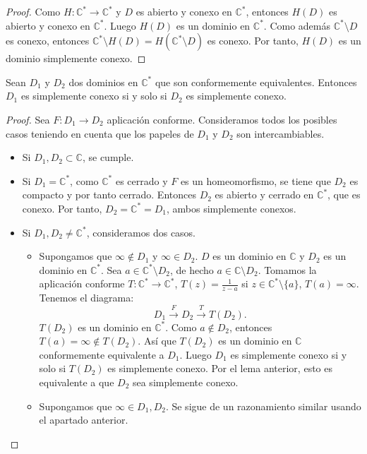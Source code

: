 \begin{proof}
    Como $H: \mathbb{C}^\ast \to \mathbb{C}^\ast$ y $D$ es abierto y conexo en $\mathbb{C}^\ast$, entonces $H(D)$ es abierto y conexo en $\mathbb{C}^\ast$.
    Luego $H(D)$ es un dominio en $\mathbb{C}^\ast$.
    Como además $\mathbb{C}^\ast \setminus D$ es conexo, entonces $\mathbb{C}^\ast \setminus H(D) = H(\mathbb{C}^\ast \setminus D)$ es conexo.
    Por tanto, $H(D)$ es un dominio simplemente conexo.
\end{proof}

\begin{theorem}
    Sean $D_1$ y $D_2$ dos dominios en $\mathbb{C}^\ast$ que son conformemente equivalentes.
    Entonces $D_1$ es simplemente conexo si y solo si $D_2$ es simplemente conexo.
\end{theorem}

\begin{proof}
    Sea $F: D_1 \to D_2$ aplicación conforme.
    Consideramos todos los posibles casos teniendo en cuenta que los papeles de $D_1$ y $D_2$ son intercambiables.
    \begin{itemize}
        \item Si $D_1, D_2 \subset \mathbb{C}$, se cumple.
        \item Si $D_1 = \mathbb{C}^\ast$, como $\mathbb{C}^\ast$ es cerrado y $F$ es un homeomorfismo, se tiene que $D_2$ es compacto y por tanto cerrado.
              Entonces $D_2$ es abierto y cerrado en $\mathbb{C}^\ast$, que es conexo.
              Por tanto, $D_2 = \mathbb{C}^\ast = D_1$, ambos simplemente conexos.
        \item Si $D_1, D_2 \neq \mathbb{C}^\ast$, consideramos dos casos.
              \begin{itemize}
                  \item Supongamos que $\infty \notin D_1$ y $\infty \in D_2$.
                        $D$ es un dominio en $\mathbb{C}$ y $D_2$ es un dominio en $\mathbb{C}^\ast$.
                        Sea $a \in \mathbb{C}^\ast \setminus D_2$, de hecho $a \in \mathbb{C} \setminus D_2$.
                        Tomamos la aplicación conforme $T: \mathbb{C}^\ast \to \mathbb{C}^\ast$, $T(z) = \frac{1}{z-a}$ si $z \in \mathbb{C}^\ast \setminus \{a\}$, $T(a) = \infty$.
                        Tenemos el diagrama:
                        $$D_1 \xrightarrow{F} D_2 \xrightarrow{T} T(D_2).$$
                        $T(D_2)$ es un dominio en $\mathbb{C}^\ast$.
                        Como $a \notin D_2$, entonces $T(a) = \infty \notin T(D_2)$.
                        Así que $T(D_2)$ es un dominio en $\mathbb{C}$ conformemente equivalente a $D_1$.
                        Luego $D_1$ es simplemente conexo si y solo si $T(D_2)$ es simplemente conexo.
                        Por el lema anterior, esto es equivalente a que $D_2$ sea simplemente conexo.

                  \item Supongamos que $\infty \in D_1, D_2$.
                        Se sigue de un razonamiento similar usando el apartado anterior.
              \end{itemize}
    \end{itemize}
\end{proof}

